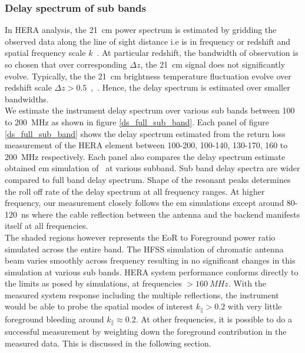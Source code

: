 \documentclass[twocolumn]{emulateapj}
\begin{document}
    \subsubsection{Delay spectrum of sub bands}
    \label{sub-band}
    In HERA analysis, the 21~cm power spectrum
    is estimated by gridding the observed data along the line of sight distance i.e
    is in frequency or redshift and spatial frequency scale
    $k$~\citep{liu_et_al2014a}. At particular redshift, the bandwidth of
    observation is so chosen that over corresponding $\Delta z$, the 21~cm
    signal does not significantly evolve. Typically, the the 21~cm brightness
    temperature fluctuation evolve over redshift scale $\Delta
    z>0.5$~\citep{loeb_zaldarriaga2004},~\citep{lidz_et_al2008}. Hence, the delay
    spectrum is estimated over smaller bandwidths.\\ We estimate the instrument
    delay spectrum over various sub bands between 100 to 200~MHz as shown in figure
    \ref{ds_full_sub_band}. Each panel of figure \ref{ds_full_sub_band} shows the
    delay spectrum estimated from the return loss measurement of the HERA element
    between 100-200, 100-140, 130-170, 160 to 200~MHz respectively. Each panel also
    compares the delay spectrum estimate obtained em simulation of~\cite{deBoer_2016} at various subband.  Sub band delay spectra are wider compared to full
    band delay spectrum.  Shape of the resonant peaks determines the roll off rate
    of the delay spectrum at all frequency ranges. At higher
    frequency, our measurement closely follows the em simulations except around
    80-120~ns where the cable reflection between the antenna and the backend manifests
    itself at all frequencies. \\ 
    The shaded regions however represents the EoR to Foreground power ratio simulated across the entire band.
    The HFSS simulation of chromatic antenna beam varies smoothly across frequency resulting in no significant changes in this simulation at various sub bands.  
     HERA system performance conforms directly to the limits as posed by simulations, at frequencies $>160~MHz$. With the measured system response including the multiple reflections, the instrument would be able to probe the spatial modes of interest $k_{\parallel}>0.2$ with very little foreground bleeding around $k_{\parallel} \approx 0.2$.
      At other frequencies, it is possible to do a successful measurement by weighting down the
      foreground contribution in the measured data. This is discussed in the following section.
\end{document}
